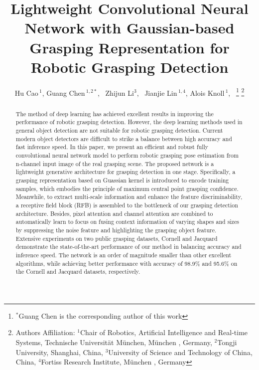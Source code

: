 \documentclass[journal]{IEEEtran}
\begin{document}
\title{Lightweight Convolutional Neural Network with Gaussian-based Grasping Representation for Robotic Grasping Detection}

\author{Hu Cao\,$^{1}$,  Guang Chen\,$^{1,2*}$,~ Zhijun Li$^{3}$,~ Jianjie Lin\,$^{1,4}$, Alois Knoll\,$^{1}$,~
\thanks{$^*$Guang Chen is the corresponding author of this work}
	\thanks{Authors Affiliation: $^{1}$Chair of Robotics, Artificial Intelligence and Real-time Systems, Technische Universit\"at M\"unchen, M\"unchen , Germany,
$^{2}$Tongji University, Shanghai, China,
		$^{3}$University of Science and Technology of China, China,
		$^{4}$Fortiss Research Institute, M\"unchen , Germany
}}
\maketitle

\begin{abstract}
The method of deep learning has achieved excellent results in improving the performance of robotic grasping detection. However, the deep learning methods used in general object detection are not suitable for robotic grasping detection. Current modern object detectors are difficult to strike a balance between high accuracy and fast inference speed. In this paper, we present an efficient and robust fully convolutional neural network model to perform robotic grasping pose estimation from n-channel input image of the real grasping scene. The proposed network is a lightweight generative architecture for grasping detection in one stage. Specifically, a grasping representation based on Guassian kernel is introduced to encode training samples, which embodies the principle of maximum central point grasping confidence. Meanwhile, to extract multi-scale information and enhance the feature discriminability, a receptive field block (RFB) is assembled to the bottleneck of our grasping detection architecture. Besides, pixel attention and channel attention are combined to automatically learn to focus on fusing context information of varying shapes and sizes by suppressing the noise feature and highlighting the grasping object feature. Extensive experiments on two public grasping datasets, Cornell and Jacquard demonstrate the state-of-the-art performance of our method in balancing accuracy and inference speed. The network is an order of magnitude smaller than other excellent algorithms, while achieving better performance with accuracy of 98.9$\%$ and 95.6$\%$ on the Cornell and Jacquard datasets, respectively. 


\end{abstract}
\end{document}
